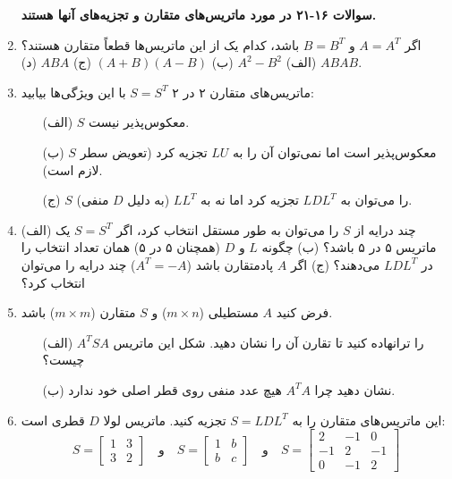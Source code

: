 \documentclass[12pt, a4paper]{book}
\begin{document}
\begin{enumerate}
		\item[] \textbf{سوالات ۱۶-۲۱ در مورد ماتریس‌های متقارن و تجزیه‌های آنها هستند.}
		\item اگر $A=A^T$ و $B=B^T$ باشد، کدام یک از این ماتریس‌ها قطعاً متقارن هستند؟
		(الف) $A^2-B^2$ \quad (ب) $(A+B)(A-B)$ \quad (ج) $ABA$ \quad (د) $ABAB$.
		
		\item ماتریس‌های متقارن ۲ در ۲ $S=S^T$ با این ویژگی‌ها بیابید:
		\begin{itemize}
			\item[(الف)] $S$ معکوس‌پذیر نیست.
			\item[(ب)] $S$ معکوس‌پذیر است اما نمی‌توان آن را به $LU$ تجزیه کرد (تعویض سطر لازم است).
			\item[(ج)] $S$ را می‌توان به $LDL^T$ تجزیه کرد اما نه به $LL^T$ (به دلیل $D$ منفی).
		\end{itemize}
		
		\item (الف) چند درایه از $S$ را می‌توان به طور مستقل انتخاب کرد، اگر $S=S^T$ یک ماتریس ۵ در ۵ باشد؟
		(ب) چگونه $L$ و $D$ (همچنان ۵ در ۵) همان تعداد انتخاب را در $LDL^T$ می‌دهند؟
		(ج) اگر $A$ پادمتقارن باشد ($A^T=-A$) چند درایه را می‌توان انتخاب کرد؟
		
		\item فرض کنید $A$ مستطیلی ($m \times n$) و $S$ متقارن ($m \times m$) باشد.
		\begin{itemize}
			\item[(الف)] $A^TSA$ را ترانهاده کنید تا تقارن آن را نشان دهید. شکل این ماتریس چیست؟
			\item[(ب)] نشان دهید چرا $A^TA$ هیچ عدد منفی روی قطر اصلی خود ندارد.
		\end{itemize}
		
		\item این ماتریس‌های متقارن را به $S=LDL^T$ تجزیه کنید. ماتریس لولا $D$ قطری است:
		\[ S = \begin{bmatrix} 1 & 3 \\ 3 & 2 \end{bmatrix} \quad \text{و} \quad S = \begin{bmatrix} 1 & b \\ b & c \end{bmatrix} \quad \text{و} \quad S = \begin{bmatrix} 2 & -1 & 0 \\ -1 & 2 & -1 \\ 0 & -1 & 2 \end{bmatrix} \]
		

\end{enumerate}
\end{document}

